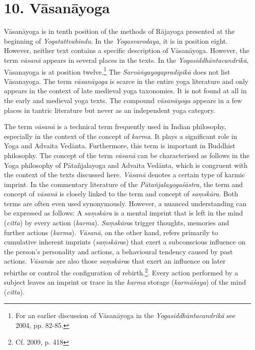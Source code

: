 \section{10. Vāsanāyoga}
\label{vasanayogaintro}

Vāsanāyoga is in tenth position of the methods of Rājayoga presented at the beginning of \textit{Yogatattvabindu}. In the \textit{Yogasvarodaya}, it is in position eight. However, neither text contains a specific description of Vāsanāyoga. However, the term \textit{vāsanā} appears in several places in the texts. In the \textit{Yogasiddhāntacandrikā}, Vāsanayoga is at position twelve.\footnote{For an earlier discussion of Vāsanāyoga in the \textit{Yogasiddhāntacandrikā} see \citeauthor{penna2004} 2004, pp. 82-85.} The \textit{Sarvāṅgayogapradīpikā} does not list Vāsanayoga. The term \textit{vāsanāyoga} is scarce in the entire yoga literature and only appears in the context of late medieval yoga taxonomies. It is not found at all in the early and medieval yoga texts. The compound \textit{vāsanāyoga} appears in a few places in tantric literature but never as an independent yoga category.  

The term \textit{vāsanā} is a technical term frequently used in Indian philosophy, especially in the context of the concept of \textit{karma}. It plays a significant role in Yoga and Advaita Vedānta. Furthermore, this term is important in Buddhist philosophy. The concept of the term \textit{vāsanā} can be characterised as follows in the Yoga philosophy of Pātañjalayoga and Advaita Vedānta, which is congruent with the context of the texts discussed here. \textit{Vāsanā} denotes a certain type of karmic imprint. In the commentary literature of the \textit{Pātañjalayogaśāstra}, the term and concept of \textit{vāsanā} is closely linked to the term and concept of \textit{saṃskāra}. Both terms are often even used synonymously. However, a nuanced understanding can be expressed as follows: A \textit{saṃskāra} is a mental imprint that is left in the mind (\textit{citta}) by every action (\textit{karma}). \textit{Saṃskāra}s trigger thoughts, memories and further actions (\textit{karma}). \textit{Vāsanā}, on the other hand, refers primarily to cumulative inherent imprints (\textit{saṃskāra}s) that exert a subconscious influence on the person's personality and actions, a behavioural tendency caused by past actions. \textit{Vāsanā}s are also those \textit{saṃskāra}s that exert an influence on later rebirths or control the configuration of rebirth.\footnote{Cf. \citeauthor{bryant2009} 2009, p. 418}. Every action performed by a subject leaves an imprint or trace in the \textit{karma} storage (\textit{karmāśaya}) of the mind (\textit{citta}).

